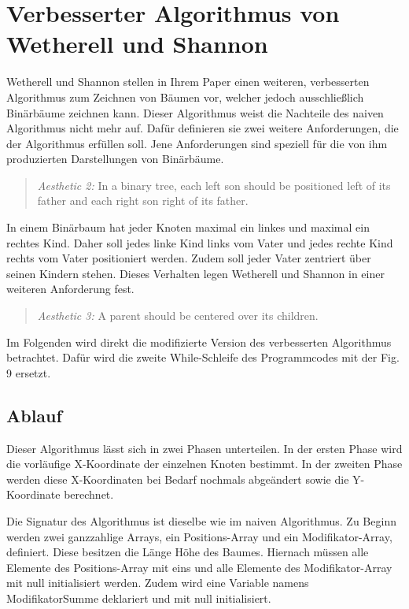 \section{Verbesserter Algorithmus von Wetherell und Shannon}
\label{chap:kapitel3_2}
Wetherell und Shannon stellen in Ihrem Paper einen weiteren, verbesserten Algorithmus zum Zeichnen von Bäumen vor, welcher jedoch
ausschließlich Binärbäume zeichnen kann\cite[]{q1}. Dieser Algorithmus weist die Nachteile des naiven Algorithmus nicht mehr auf.
Dafür definieren sie zwei weitere Anforderungen, die der Algorithmus erfüllen soll. Jene Anforderungen sind speziell für
die von ihm produzierten Darstellungen von Binärbäume.   

\begin{quotation}
	\textit{Aesthetic 2:} In a binary tree, each left son should be positioned
	left of its father and each right son right of its father\cite[]{q1}.
\end{quotation}

In einem Binärbaum hat jeder Knoten maximal ein linkes und maximal ein rechtes Kind. Daher soll jedes linke Kind 
links vom Vater und jedes rechte Kind rechts vom Vater positioniert werden. Zudem soll jeder Vater zentriert über seinen Kindern
stehen. Dieses Verhalten legen Wetherell und Shannon in einer weiteren Anforderung fest.

\begin{quotation}
	\textit{Aesthetic 3:} A parent should be centered over its children\cite[]{q1}.
\end{quotation}

Im Folgenden wird direkt die modifizierte Version des verbesserten Algorithmus betrachtet. Dafür wird die zweite While-Schleife des Programmcodes
mit der Fig. 9 \cite[A modification of Algorithm 3]{q1} ersetzt.

\label{chap:kapitel3_2_Ablauf}
\subsection{Ablauf}

Dieser Algorithmus lässt sich in zwei Phasen unterteilen. In der ersten Phase wird die vorläufige X-Koordinate der einzelnen Knoten bestimmt.
In der zweiten Phase werden diese X-Koordinaten bei Bedarf nochmals abgeändert sowie die Y-Koordinate berechnet.

Die Signatur des Algorithmus ist dieselbe wie im naiven Algorithmus. Zu Beginn werden zwei
ganzzahlige Arrays, ein Positions-Array und ein Modifikator-Array, definiert. Diese besitzen die Länge \glqq Höhe des Baumes\grqq{}.
Hiernach müssen alle Elemente des Positions-Array mit eins und alle Elemente des Modifikator-Array mit null initialisiert werden.
Zudem wird eine Variable namens \glqq ModifikatorSumme\grqq{} deklariert und mit null initialisiert.

